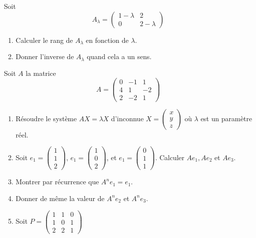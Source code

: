 \documentclass[a4paper, 11pt,reqno]{article}
\begin{document}
\begin{exercice}
Soit $$ A_\lambda=\left(\begin{array}{cc}  1-\lambda&2\\0&2-\lambda \end{array}\right)$$
\begin{enumerate}
\item Calculer le rang de $A_\lambda$ en fonction de $\lambda$.
\item Donner l'inverse de $A_\lambda$ quand cela a un sens.
\end{enumerate}
\end{exercice}







\begin{exercice}
Soit $A$ la matrice 
$$A=\left(
\begin{array}{ccc}
0&-1&1\\
4&1&-2\\
2&-2&1
\end{array}
 \right)$$
 
 
\begin{enumerate}
\item Résoudre le système $AX=\lambda X$ d'inconnue $X =\left(
\begin{array}{c}
x\\
y\\
z
\end{array}
 \right)$ où $\lambda$ est un paramètre réel. 
 
 \item Soit $e_1= \left(
\begin{array}{c}
1\\
1\\
2
\end{array}
 \right)$,  $e_1= \left(
\begin{array}{c}
1\\
0\\
2
\end{array}
 \right)$, et  $e_1= \left(
\begin{array}{c}
0\\
1\\
1
\end{array}
 \right)$.
 Calculer $Ae_1, Ae_2$ et $Ae_3$. 
 
\item Montrer par récurrence que $A^ne_1= e_1$. 
\item Donner de même la valeur de $A^n e_2 $ et $A^n e_3$.
\item Soit $P= \left(
\begin{array}{ccc}
1&1&0\\
1&0&1\\
2&2&1
\end{array}
 \right)$ 
 

\end{enumerate}
\end{exercice}
\end{document}
